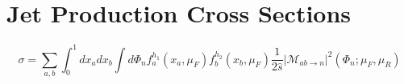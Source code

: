 \section{Jet Production Cross Sections}\label{jetgroom:ch1}



\begin{equation}
\sigma=\sum_{a, b} \int_{0}^{1} d x_{a} d x_{b} \int d \Phi_{n} f_{a}^{h_{1}}\left(x_{a}, \mu_{F}\right) f_{b}^{h_{2}}\left(x_{b}, \mu_{F}\right) \frac{1}{2 \hat{s}}\left|\mathcal{M}_{a b \rightarrow n}\right|^{2}\left(\Phi_{n} ; \mu_{F}, \mu_{R}\right)
\end{equation}



